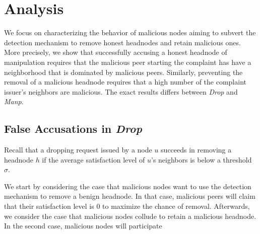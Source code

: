 \section{Analysis}
\label{sec:analysis}



We focus on characterizing the behavior of malicious nodes aiming to subvert the detection mechanism to remove honest headnodes and retain malicious ones. 
More precisely, we show that successfully accusing a honest headnode of manipulation requires that the malicious peer starting the complaint has have a neighborhood that is dominated by malicious peers. Similarly, preventing the removal of a malicious headnode requires that a high number of the complaint issuer's neighbors are malicious. 
The exact results differs between \textit{Drop} and \textit{Manp}.



\subsection{False Accusations in \textit{Drop}} 
  
Recall that a dropping request issued by a node $u$ succeeds in removing a headnode $h$ if the average satisfaction level of  $u$'s neighbors is below a threshold $\sigma$.  

We start by considering the case that malicious nodes want to use the detection mechanism to remove a benign headnode. In that case, malicious peers will claim that their satisfaction level is 0 to maximize the chance of removal. 
Afterwards, we consider the case that malicious nodes collude to retain a malicious headnode. In the second case, malicious nodes will participate 
 

